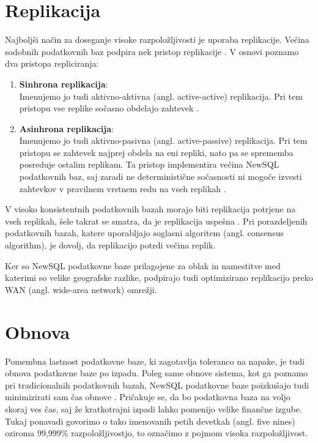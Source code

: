 \documentclass[a4paper, 12pt]{book}
\begin{document}
\section{Replikacija}

Najboljši način za doseganje visoke razpoložljivosti je uporaba replikacije. Večina sodobnih podatkovnih baz podpira nek pristop replikacije \cite{Pavlo2016Sep}. V osnovi poznamo dva pristopa repliciranja:
\begin{enumerate}
    \item \textbf{Sinhrona replikacija}:\\Imenujemo jo tudi aktivno-aktivna (angl. active-active) replikacija. Pri tem pristopu vse replike sočasno obdelajo zahtevek \cite{Pavlo2016Sep}.

    \item \textbf{Asinhrona replikacija}:\\Imenujemo jo tudi aktivno-pasivna (angl. active-passive) replikacija. Pri tem pristopu se zahtevek najprej obdela na eni repliki, nato pa se sprememba posreduje ostalim replikam. Ta pristop implementira večina NewSQL podatkovnih baz, saj zaradi ne deterministične sočas\-nosti ni mogoče izvesti zahtevkov v pravilnem vrstnem redu na vseh replikah \cite{Pavlo2016Sep, harding2017evaluation}.
\end{enumerate}

V visoko konsistentnih podatkovnih bazah morajo biti replikacija potrjene na vseh replikah, šele takrat se smatra, da je replikacija uspešna \cite{NewSqlInMemoryAnalytics}. Pri porazdeljenih podatkovnih bazah, katere uporabljajo soglasni algoritem (angl. consensus algorithm), je dovolj, da replikacijo potrdi večina replik.

Ker so NewSQL podatkovne baze prilagojene za oblak in namestitve med katerimi so velike geografske razlike, podpirajo tudi optimizirano replikacijo preko WAN (angl. wide-area network) omrežji.

\section{Obnova}
Pomembna lastnost podatkovne baze, ki zagotavlja toleranco na napake, je tudi obnova podatkovne baze po izpadu. Poleg same obnove sistema, kot ga poznamo pri tradicionalnih podatkovnih bazah, NewSQL podatkovne baze  poizkušajo tudi minimizirati sam čas obnove \cite{Pavlo2016Sep}. Pričakuje se, da bo podatkovna baza na voljo skoraj ves čas, saj že kratkotrajni izpadi lahko pomenijo velike finančne izgube. Tukaj ponavadi govorimo o tako imenovanih petih devetkah (angl. five nines) oziroma 99,999\% razpoložljivostjo, to označimo z pojmom visoka razpoložljivost.
\end{document}
